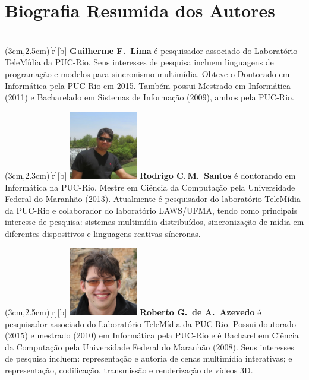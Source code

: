 \documentclass{SBCbookchapter}
\begin{document}
\section*{Biografia Resumida dos Autores}

~\\

\parpic(3cm,2.5cm)[r][b]{%
}
\noindent\textbf{Guilherme F.~Lima} é pesquisador associado do Laboratório
TeleMídia da PUC-Rio.  Seus interesses de pesquisa incluem linguagens de
programação e modelos para sincronismo multimídia.  Obteve o Doutorado em
Informática pela PUC-Rio em 2015.  Também possui Mestrado em Informática (2011)
e Bacharelado em Sistemas de Informação (2009), ambos pela PUC-Rio.
\vspace{1cm}

\parpic(3cm,2.3cm)[r][b]{%
  \includegraphics[width=3cm,height=3cm]{photos/rodrigo}
}
\noindent\textbf{Rodrigo C.\,M.~Santos} é doutorando em Informática na PUC-Rio.
Mestre em Ciência da Computação pela Universidade Federal do Maranhão (2013).
Atualmente é pesquisador do laboratório TeleMídia da PUC-Rio e colaborador do
laboratório LAWS/UFMA, tendo como principais interesse de pesquisa: sistemas
multimídia distribuídos, sincronização de mídia em diferentes dispositivos e
linguagens reativas síncronas. 
\vspace{1cm}

\parpic(3cm,2.5cm)[r][b]{%
  \includegraphics[width=3cm,height=3cm]{photos/roberto}
}
\noindent\textbf{Roberto G.\, de A.~Azevedo} é pesquisador associado do
Laboratório TeleMídia da PUC-Rio. Possui doutorado (2015) e mestrado (2010) em
Informática pela PUC-Rio e é Bacharel em Ciência da Computação pela
Universidade Federal do Maranhão (2008). Seus interesses de pesquisa incluem:
representação e autoria de cenas multimídia interativas; e representação,
codificação, transmissão e renderização de vídeos 3D.
\end{document}
